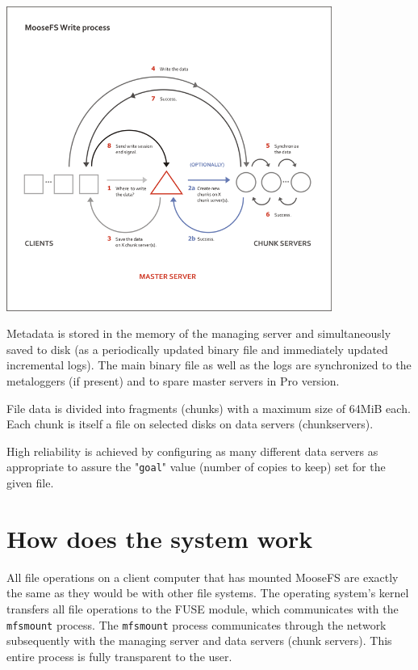 \documentclass[a4paper,11pt,english]{report}
\def\code#1{\texttt{#1}}
\begin{document}
		\vfill

		\begin{center}
			\includegraphics[width=0.8\textwidth]{images/write_mfs.png}\\[1cm]
		\end{center}
		
		Metadata is stored in the memory of the managing server and simultaneously saved to disk (as a periodically updated binary file and immediately updated incremental logs). The main binary file as well as the logs are synchronized to the metaloggers (if present) and to spare master servers in Pro version.
		
		File data is divided into fragments (chunks) with a maximum size of 64MiB each. Each chunk is itself a file on selected disks on data servers (chunkservers).
		
High reliability is achieved by configuring as many different data servers as appropriate to assure the "\code{goal}" value (number of copies to keep) set for the given file.
		
		
		\section{How does the system work}
		All file operations on a client computer that has mounted MooseFS are exactly the same as they would be with other file systems. The operating system's kernel transfers all file operations to the FUSE module, which communicates with the \code{mfsmount} process. The \code{mfsmount} process communicates through the network subsequently with the managing server and data servers (chunk servers). This entire process is fully transparent to the user.\\\\
		
\end{document}

